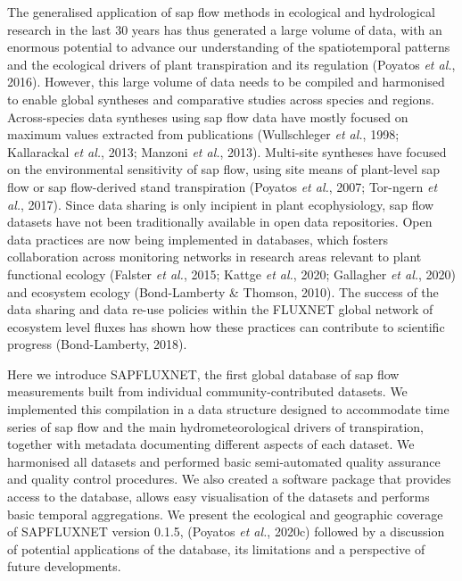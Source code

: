 \documentclass[11pt,twoside]{reedthesis}
\begin{document}
The generalised application of sap flow methods in ecological and
hydrological research in the last 30 years has thus generated a large
volume of data, with an enormous potential to advance our understanding
of the spatiotemporal patterns and the ecological drivers of plant
transpiration and its regulation (Poyatos \emph{et al.}, 2016). However,
this large volume of data needs to be compiled and harmonised to enable
global syntheses and comparative studies across species and regions.
Across-species data syntheses using sap flow data have mostly focused on
maximum values extracted from publications (Wullschleger \emph{et al.},
1998; Kallarackal \emph{et al.}, 2013; Manzoni \emph{et al.}, 2013).
Multi-site syntheses have focused on the environmental sensitivity of
sap flow, using site means of plant-level sap flow or sap flow-derived
stand transpiration (Poyatos \emph{et al.}, 2007; Tor-ngern \emph{et
al.}, 2017). Since data sharing is only incipient in plant
ecophysiology, sap flow datasets have not been traditionally available
in open data repositories. Open data practices are now being implemented
in databases, which fosters collaboration across monitoring networks in
research areas relevant to plant functional ecology (Falster \emph{et
al.}, 2015; Kattge \emph{et al.}, 2020; Gallagher \emph{et al.}, 2020)
and ecosystem ecology (Bond-Lamberty \& Thomson, 2010). The success of
the data sharing and data re-use policies within the FLUXNET global
network of ecosystem level fluxes has shown how these practices can
contribute to scientific progress (Bond-Lamberty, 2018).\par

Here we introduce SAPFLUXNET, the first global database of sap flow
measurements built from individual community-contributed datasets. We
implemented this compilation in a data structure designed to accommodate
time series of sap flow and the main hydrometeorological drivers of
transpiration, together with metadata documenting different aspects of
each dataset. We harmonised all datasets and performed basic
semi-automated quality assurance and quality control procedures. We also
created a software package that provides access to the database, allows
easy visualisation of the datasets and performs basic temporal
aggregations. We present the ecological and geographic coverage of
SAPFLUXNET version 0.1.5, (Poyatos \emph{et al.}, 2020c) followed by a
discussion of potential applications of the database, its limitations
and a perspective of future developments. \par
\end{document}
